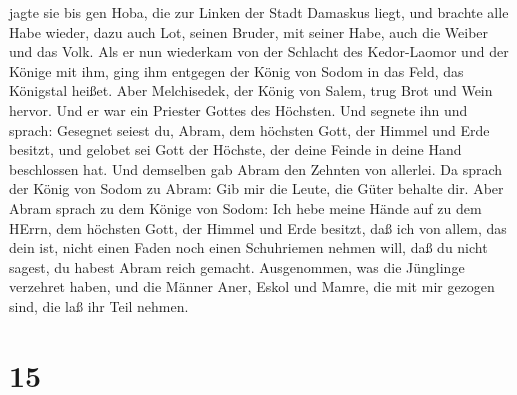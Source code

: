 jagte sie bis gen Hoba, die zur Linken der Stadt Damaskus liegt,
 und brachte alle Habe wieder, dazu auch Lot, seinen
Bruder, mit seiner Habe, auch die Weiber und das Volk.  Als
er nun wiederkam von der Schlacht des Kedor-Laomor und der Könige mit
ihm, ging ihm entgegen der König von Sodom in das Feld, das Königstal
heißet.  Aber Melchisedek, der König von Salem, trug Brot
und Wein hervor. Und er war ein Priester Gottes des Höchsten.
 Und segnete ihn und sprach: Gesegnet seiest du, Abram, dem
höchsten Gott, der Himmel und Erde besitzt,  und gelobet
sei Gott der Höchste, der deine Feinde in deine Hand beschlossen hat.
Und demselben gab Abram den Zehnten von allerlei.  Da
sprach der König von Sodom zu Abram: Gib mir die Leute, die Güter
behalte dir.  Aber Abram sprach zu dem Könige von Sodom:
Ich hebe meine Hände auf zu dem HErrn, dem höchsten Gott, der Himmel und
Erde besitzt,  daß ich von allem, das dein ist, nicht einen
Faden noch einen Schuhriemen nehmen will, daß du nicht sagest, du habest
Abram reich gemacht.  Ausgenommen, was die Jünglinge
verzehret haben, und die Männer Aner, Eskol und Mamre, die mit mir
gezogen sind, die laß ihr Teil nehmen.

\hypertarget{section-14}{%
\section{15}\label{section-14}}

